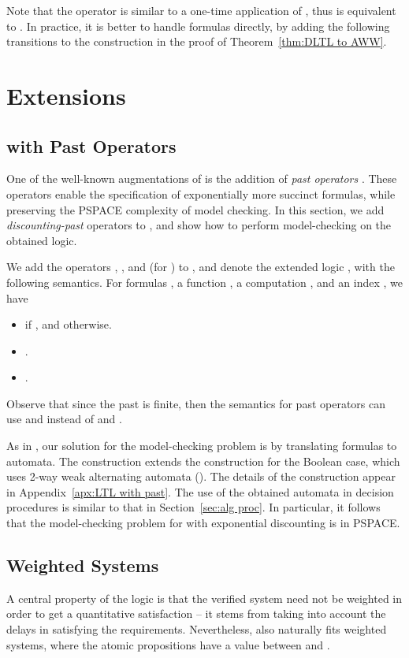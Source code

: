 \documentclass{llncs}
\begin{document}
Note that the operator  is similar to a one-time application of
, thus  is equivalent to . In practice, it is better to handle  formulas directly, by adding the following transitions to the construction in the proof of Theorem~\ref{thm:DLTL to AWW}.

\hspace{-.6cm}

\vspace*{-3mm}
\section{Extensions}\label{sec:ext}

\subsection{ with Past Operators}
\label{ext:past}
One of the well-known augmentations of  is the addition of {\em past operators\/} \cite{LPZ85}. These operators enable the specification of exponentially more succinct formulas, while preserving the PSPACE complexity of model checking.
In this section, we add {\em discounting-past} operators to , and show how to perform model-checking on the obtained logic.

We add the operators , , and  (for ) to , and denote the extended logic , with the following semantics. For  formulas , a function , a computation , and an index , we have
\begin{itemize}
\item  if , and  otherwise.
\item .
\item .
\end{itemize}
Observe that since the past is finite, then the semantics for past operators can use  and  instead of  and . 

As in , our solution for the  model-checking problem is by translating  formulas to automata. The construction extends the construction for the Boolean case, which uses 2-way weak alternating automata (). The details of the construction appear in Appendix~\ref{apx:LTL with past}. The use of the obtained automata in decision procedures is similar to that in Section~\ref{sec:alg proc}. In particular, it follows that the model-checking problem for  with exponential discounting is in PSPACE.


\subsection{Weighted Systems}
\label{wsys}
A central property of the logic  is that the verified system need not be weighted in order to get a quantitative satisfaction -- it stems from taking into account the delays in satisfying the requirements. Nevertheless,   also naturally fits weighted systems, where the atomic propositions have a value between  and .
\end{document}
